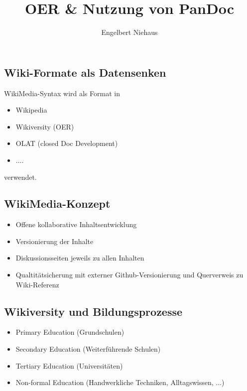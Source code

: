 \documentclass[]{article}
\title{OER & Nutzung von PanDoc}
\author{Engelbert Niehaus}
\date{}
\providecommand{\tightlist}{%
  \setlength{\itemsep}{0pt}\setlength{\parskip}{0pt}}
\begin{document}
\maketitle

{
\setcounter{tocdepth}{3}
\tableofcontents
}
\subsection{Wiki-Formate als
Datensenken}\label{wiki-formate-als-datensenken}

WikiMedia-Syntax wird als Format in

\begin{itemize}
\tightlist
\item
  Wikipedia
\item
  Wikiversity (OER)
\item
  OLAT (closed Doc Development)
\item
  ....
\end{itemize}

verwendet.

\subsection{WikiMedia-Konzept}\label{wikimedia-konzept}

\begin{itemize}
\tightlist
\item
  Offene kollaborative Inhaltsentwicklung
\item
  Versionierung der Inhalte
\item
  Diskussionsseiten jeweils zu allen Inhalten
\item
  Qualtitätsicherung mit externer Github-Versionierung und Querverweis
  zu Wiki-Referenz
\end{itemize}

\subsection{Wikiversity und
Bildungsprozesse}\label{wikiversity-und-bildungsprozesse}

\begin{itemize}
\tightlist
\item
  Primary Education (Grundschulen)
\item
  Secondary Education (Weiterführende Schulen)
\item
  Tertiary Education (Universitäten)
\item
  Non-formal Education (Handwerkliche Techniken, Alltagswissen, ...)
\end{itemize}
\end{document}
